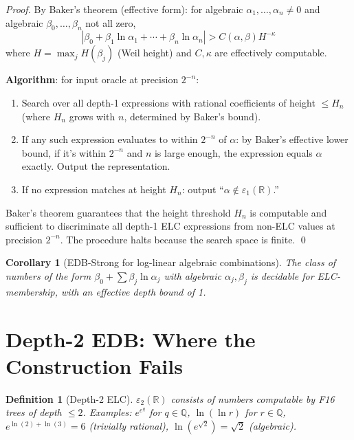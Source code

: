\documentclass[11pt]{article}
\newtheorem{corollary}[theorem]{Corollary}
\newtheorem{definition}[theorem]{Definition}
\begin{document}
\begin{proof}
By Baker's theorem (effective form): for algebraic $\alpha_1, \ldots, \alpha_n \neq 0$
and algebraic $\beta_0, \ldots, \beta_n$ not all zero,
\[
|\beta_0 + \beta_1 \ln \alpha_1 + \cdots + \beta_n \ln \alpha_n| > C(\alpha, \beta) H^{-\kappa}
\]
where $H = \max_j H(\beta_j)$ (Weil height) and $C, \kappa$ are effectively computable.

\textbf{Algorithm}: for input oracle at precision $2^{-n}$:
\begin{enumerate}
  \item Search over all depth-1 expressions with rational coefficients of height $\leq H_n$
    (where $H_n$ grows with $n$, determined by Baker's bound).
  \item If any such expression evaluates to within $2^{-n}$ of $\alpha$:
    by Baker's effective lower bound, if it's within $2^{-n}$ and $n$ is large enough,
    the expression equals $\alpha$ exactly. Output the representation.
  \item If no expression matches at height $H_n$: output ``$\alpha \notin \varepsilon_1(\mathbb{R})$.''
\end{enumerate}

Baker's theorem guarantees that the height threshold $H_n$ is computable
and sufficient to discriminate all depth-1 ELC expressions from non-ELC values
at precision $2^{-n}$. The procedure halts because the search space is finite. \qed
\end{proof}

\begin{corollary}[EDB-Strong for log-linear algebraic combinations]
The class of numbers of the form $\beta_0 + \sum \beta_j \ln \alpha_j$ with
algebraic $\alpha_j, \beta_j$ is decidable for ELC-membership, with an effective
depth bound of 1.
\end{corollary}

\section{Depth-2 EDB: Where the Construction Fails}

\begin{definition}[Depth-2 ELC]
$\varepsilon_2(\mathbb{R})$ consists of numbers computable by F16 trees of depth $\leq 2$.
Examples: $e^{e^q}$ for $q \in \mathbb{Q}$, $\ln(\ln r)$ for $r \in \mathbb{Q}$,
$e^{\ln(2) + \ln(3)} = 6$ (trivially rational), $\ln(e^{\sqrt{2}}) = \sqrt{2}$ (algebraic).
\end{definition}
\end{document}
